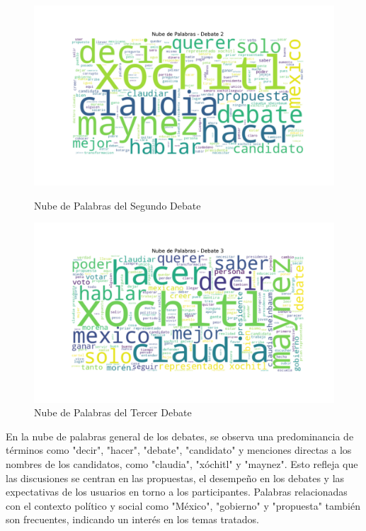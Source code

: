 \documentclass[10pt, a4paper]{article}
\begin{document}
	
	\begin{figure}[h!]
		\centering
		\begin{minipage}{0.49\textwidth} %
			\includegraphics[width=\linewidth]{nube_palabras_debate_2.pdf} 
			\vspace{-10mm}
			\caption{Nube de Palabras del Segundo Debate}
			\label{fig:nubeDebate2}
		\end{minipage}
		\hfill %
		\begin{minipage}{0.49\textwidth}
			\includegraphics[width=\linewidth]{nube_palabras_debate_3.pdf}
			\vspace{-10mm}
			\caption{Nube de Palabras del Tercer Debate}
			\label{fig:nubeDebate3}
		\end{minipage}
	\end{figure}

	En la nube de palabras general de los debates, se observa una predominancia de términos como "decir", "hacer", "debate", "candidato" y menciones directas a los nombres de los candidatos, como "claudia", "xóchitl" y "maynez". Esto refleja que las discusiones se centran en las propuestas, el desempeño en los debates y las expectativas de los usuarios en torno a los participantes. Palabras relacionadas con el contexto político y social como "México", "gobierno" y "propuesta" también son frecuentes, indicando un interés en los temas tratados.
	
\end{document}
